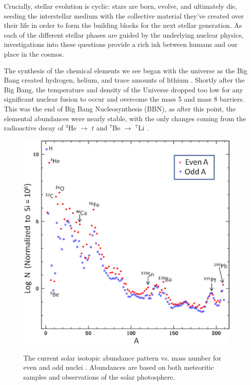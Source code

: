 \noindent Crucially, stellar evolution is cyclic: stars are born, evolve, and ultimately die, seeding the interstellar medium with the collective material they've created over their life in order to form the building blocks for the next stellar generation. As each of the different stellar phases are guided by the underlying nuclear physics, investigations into these questions provide a rich ink between humans and our place in the cosmos. 

The synthesis of the chemical elements we see began with the universe as the Big Bang created hydrogen, helium, and trace amounts of lithium \cite{Alpher1948}. Shortly after the Big Bang, the temperature and density of the Universe dropped too low for any significant nuclear fusion to occur and overcome the mass 5 and mass 8 barriers. This was the end of Big Bang Nucleosynthesis (BBN), as after this point, the elemental abundances were nearly stable, with the only changes coming from the radioactive decay of $^{3}$He $\rightarrow$ $t$ and $^{7}$Be $\rightarrow$ $^{7}$Li \cite{Fields2011}.

\begin{figure}
\includegraphics[width=\linewidth]{figures/abundances.jpg}
\label{fig: abundances}
\caption{The current solar isotopic abundance pattern vs. mass number for even and odd nuclei \cite{Jose2011a}. Abundances are based on both meteoritic samples and observations of the solar photosphere. }
\end{figure}


